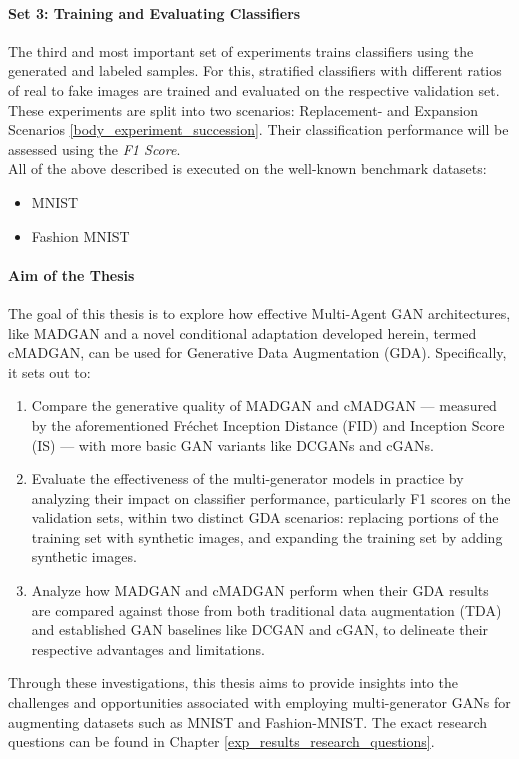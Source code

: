 \paragraph{Set 3: Training and Evaluating Classifiers}  \label{thesis_goal_3}
The third and most important set of experiments trains classifiers using the generated and labeled samples. For this, stratified classifiers with different ratios of real to fake images are trained and evaluated on the respective validation set. These experiments are split into two scenarios: Replacement- and Expansion Scenarios \ref{body_experiment_succession}. Their classification performance will be assessed using the \textit{F1 Score}.  \\

\noindent All of the above described is executed on the well-known benchmark datasets:
\begin{itemize}\label{used_datasets}
    \setlength{\itemsep}{-5pt}
    \item MNIST \cite{lecun2010mnist}
    \item Fashion MNIST \cite{xiao2017fashionmnist}
\end{itemize}


\paragraph{Aim of the Thesis}\label{aim_of_the_thesis}

The goal of this thesis is to explore how effective Multi-Agent GAN architectures, like MADGAN and a novel conditional adaptation developed herein, termed cMADGAN, can be used for Generative Data Augmentation (GDA). Specifically, it sets out to:

\begin{enumerate}
    \item Compare the generative quality of MADGAN and cMADGAN --- measured by the aforementioned Fréchet Inception Distance (FID) and Inception Score (IS) --- with more basic GAN variants like DCGANs and cGANs.
    \item Evaluate the effectiveness of the multi-generator models in practice by analyzing their impact on classifier performance, particularly F1 scores on the validation sets, within two distinct GDA scenarios: replacing portions of the training set with synthetic images, and expanding the training set by adding synthetic images.
    \item Analyze how MADGAN and cMADGAN perform when their GDA results are compared against those from both traditional data augmentation (TDA) and established GAN baselines like DCGAN and cGAN, to delineate their respective advantages and limitations.
\end{enumerate}
\noindent Through these investigations, this thesis aims to provide insights into the challenges and opportunities associated with employing multi-generator GANs for augmenting datasets such as MNIST and Fashion-MNIST. The exact research questions can be found in Chapter \ref{exp_results_research_questions}.

